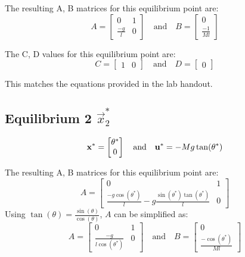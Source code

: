 \documentclass[10pt]{article}
\begin{document}
The resulting A, B matrices for this equilibrium point are:
\begin{equation*}
        A = 
        \begin{bmatrix}
        0 &1 \\ \frac{-g}{l} & 0
        \end{bmatrix}
        \quad
        \text{and}
        \quad
        B = 
        \begin{bmatrix}
        0\\ \frac{-1}{Ml}
        \end{bmatrix}
\end{equation*}

The C, D values for this equilibrium point are:
\begin{equation*}
    C = 
        \begin{bmatrix}
        1 & 0
        \end{bmatrix}
        \quad
        \text{and}
        \quad
        D = 
        \begin{bmatrix}
        0
        \end{bmatrix}
\end{equation*}

This matches the equations provided in the lab handout.
\subsection{Equilibrium 2 \texorpdfstring{$\vec{x}_2^*$}{x2*}}
\begin{equation*}
        \mathbf{x}^* =
     \begin{bmatrix} \theta^* \\ 0 \end{bmatrix}
     \quad
     \text{and}
     \quad
     \mathbf{u}^* = -Mg\tan(\theta^*) 
\end{equation*}

The resulting A, B matrices for this equilibrium point are:
\begin{equation*}
        A = 
        \begin{bmatrix}
        0 &1 \\ \frac{-g\cos(\theta^*)}{l} - g \frac{\sin(\theta^*) \tan(\theta^*)}{l} & 0
        \end{bmatrix}
\end{equation*}
Using $\tan(\theta) = \frac{\sin(\theta)}{\cos(\theta)}$, $A$ can be simplified as:
\begin{equation*}
        A =
        \begin{bmatrix}
        0 &1 \\ \frac{-g}{l\cos(\theta^*)} & 0
        \end{bmatrix}
        \quad
        \text{and}
        \quad
        B = 
        \begin{bmatrix}
            0\\ \frac{-\cos(\theta^*)}{Ml}
        \end{bmatrix}
\end{equation*}
\end{document}
